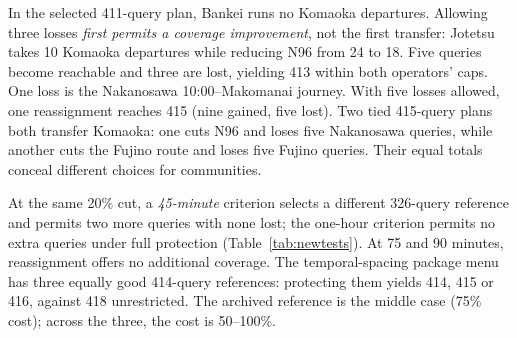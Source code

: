 \documentclass[11pt]{article}
\begin{document}
In the selected 411-query plan, Bankei runs no Komaoka departures. Allowing three losses \emph{first permits a coverage improvement}, not the first transfer: Jotetsu takes 10 Komaoka departures while reducing N96 from 24 to 18. Five queries become reachable and three are lost, yielding 413 within both operators' caps. One loss is the Nakanosawa 10:00--Makomanai journey. With five losses allowed, one reassignment reaches 415 (nine gained, five lost). Two tied 415-query plans both transfer Komaoka: one cuts N96 and loses five Nakanosawa queries, while another cuts the Fujino route and loses five Fujino queries. Their equal totals conceal different choices for communities.

\begin{table}[H]
\centering
\caption{Original offset and fixed-operator reference sensitivity (60-minute threshold). All-gain forfeiture is counted only where reassignment improves coverage.}
\label{tab:phase}
\small
{}
\end{table}

At the same 20\% cut, a \emph{45-minute} criterion selects a different 326-query reference and permits two more queries with none lost; the one-hour criterion permits no extra queries under full protection (Table~\ref{tab:newtests}). At 75 and 90 minutes, reassignment offers no additional coverage. The temporal-spacing package menu has three equally good 414-query references: protecting them yields 414, 415 or 416, against 418 unrestricted. The archived reference is the middle case (75\% cost); across the three, the cost is 50--100\%.
\end{document}
